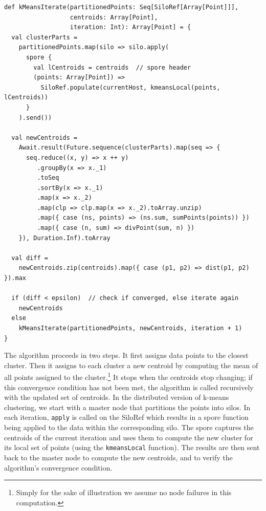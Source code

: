 \documentclass{jfp1}
\begin{document}

\begin{lstlisting}
def kMeansIterate(partitionedPoints: Seq[SiloRef[Array[Point]]],
                  centroids: Array[Point],
                  iteration: Int): Array[Point] = {
  val clusterParts =
    partitionedPoints.map(silo => silo.apply(
      spore {
        val lCentroids = centroids  // spore header
        (points: Array[Point]) =>
          SiloRef.populate(currentHost, kmeansLocal(points, lCentroids))
      }
    ).send())

  val newCentroids =
    Await.result(Future.sequence(clusterParts).map(seq => {
      seq.reduce((x, y) => x ++ y)
         .groupBy(x => x._1)
         .toSeq
         .sortBy(x => x._1)
         .map(x => x._2)
         .map(clp => clp.map(x => x._2).toArray.unzip)
         .map({ case (ns, points) => (ns.sum, sumPoints(points)) })
         .map({ case (n, sum) => divPoint(sum, n) })
    }), Duration.Inf).toArray

  val diff =
    newCentroids.zip(centroids).map({ case (p1, p2) => dist(p1, p2) }).max

  if (diff < epsilon)  // check if converged, else iterate again
    newCentroids
  else
    kMeansIterate(partitionedPoints, newCentroids, iteration + 1)
}
\end{lstlisting}
\noindent
The algorithm proceeds in two steps. It first assigns data points to
the closest cluster. Then it assigns to each cluster a new centroid by
computing the mean of all points assigned to the cluster.\footnote{Simply for the sake of illustration we assume no node failures in this computation.} It stops
when the centroids stop changing; if this convergence condition has not
been met, the algorithm is called recursively with the updated set of
centroids. In the distributed version of k-means clustering, we start
with a master node that partitions the points into silos. In each
iteration, \verb|apply| is called on the SiloRef which results in a
spore function being applied to the data within the corresponding
silo. The spore captures the centroids of the current iteration and
uses them to compute the new cluster for its local set of points
(using the \verb|kmeansLocal| function). The results are then sent
back to the master node to compute the new centroids, and to verify
the algorithm's convergence condition.
\end{document}
